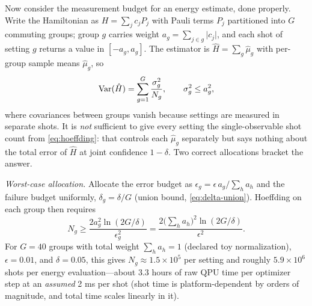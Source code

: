 Now consider the measurement budget for an energy estimate, done properly. Write the Hamiltonian as $H=\sum_j c_j P_j$ with Pauli terms $P_j$ partitioned into $G$ commuting groups; group $g$ carries weight $a_g=\sum_{j\in g}\lvert c_j\rvert$, and each shot of setting $g$ returns a value in $[-a_g,a_g]$. The estimator is $\hat H=\sum_g \hat\mu_g$ with per-group sample means $\hat\mu_g$, so
\begin{equation}
\operatorname{Var}(\hat H)=\sum_{g=1}^{G}\frac{\sigma_g^2}{N_g},
\qquad \sigma_g^2\leq a_g^2,
\label{eq:grouped-variance}
\end{equation}
where covariances between groups vanish because settings are measured in separate shots. It is \emph{not} sufficient to give every setting the single-observable shot count from \cref{eq:hoeffding}: that controls each $\hat\mu_g$ separately but says nothing about the total error of $\hat H$ at joint confidence $1-\delta$. Two correct allocations bracket the answer.

\emph{Worst-case allocation.} Allocate the error budget as $\epsilon_g=\epsilon\, a_g/\sum_h a_h$ and the failure budget uniformly, $\delta_g=\delta/G$ (union bound, \cref{eq:delta-union}). Hoeffding on each group then requires
\begin{equation}
N_g\geq \frac{2a_g^2\ln(2G/\delta)}{\epsilon_g^2}
=\frac{2\bigl(\sum_h a_h\bigr)^2\ln(2G/\delta)}{\epsilon^2}.
\label{eq:worstcase-shots}
\end{equation}
For $G=40$ groups with total weight $\sum_h a_h=1$ (declared toy normalization), $\epsilon=0.01$, and $\delta=0.05$, this gives $N_g\approx1.5\times10^{5}$ per setting and roughly $5.9\times10^{6}$ shots per energy evaluation---about 3.3 hours of raw QPU time per optimizer step at an \emph{assumed} 2 ms per shot (shot time is platform-dependent by orders of magnitude, and total time scales linearly in it).

